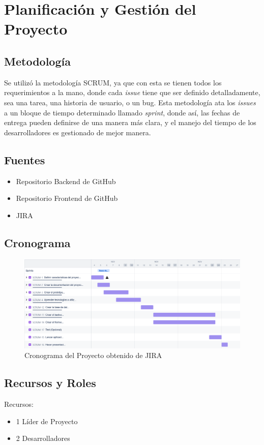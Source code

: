 	\chapter{Planificación y Gestión del Proyecto}

	\section{Metodología}
	Se utiliz\'o la metodolog\'ia SCRUM, ya que con esta se tienen todos los requerimientos a la mano, donde cada \textit{issue} tiene que ser definido detalladamente, sea una tarea, una historia de usuario, o un bug. Esta metodolog\'ia ata los \textit{issues} a un bloque de tiempo determinado llamado \textit{sprint}, donde as\'i, las fechas de entrega pueden definirse de una manera m\'as clara, y el manejo del tiempo de los desarrolladores es gestionado de mejor manera.
	\section{Fuentes}
	\begin{itemize}
		\item Repositorio Backend de GitHub
		\item Repositorio Frontend de GitHub
		\item JIRA
	\end{itemize}

	\section{Cronograma}
	\begin{figure}[h!]
		\centering
		\includegraphics[width=0.9\linewidth]{./images/proyecto_final_ingr_2024-11-05_11.32am}
		\caption{Cronograma del Proyecto obtenido de JIRA}
	\end{figure}
	
	\pagebreak
	\section{Recursos y Roles}
	Recursos:
	\begin{itemize}
		\item 1 Líder de Proyecto
		\item 2 Desarrolladores
	\end{itemize}

